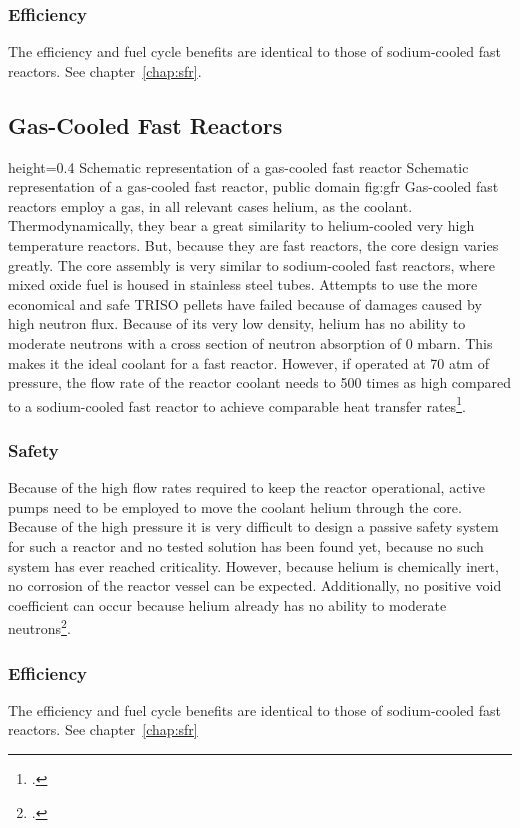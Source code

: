 \subsubsection{Efficiency}
The efficiency and fuel cycle benefits are identical to those of sodium-cooled fast reactors. See chapter~\ref{chap:sfr}.
\pagebreak
\subsection{Gas-Cooled Fast Reactors}
    {height=0.4\textheight}
    {Schematic representation of a gas-cooled fast reactor}
    {Schematic representation of a gas-cooled fast reactor, public domain}
    {fig:gfr}
Gas-cooled fast reactors employ a gas, in all relevant cases helium, as the coolant. Thermodynamically,
they bear a great similarity to helium-cooled very high temperature reactors. But, because they
are fast reactors, the core design varies greatly. The core assembly is very similar to sodium-cooled
fast reactors, where mixed oxide fuel is housed in stainless steel tubes. Attempts to use the more
economical and safe TRISO pellets have failed because of damages caused by high neutron flux. Because
of its very low density, helium has no ability to moderate neutrons with a cross section of neutron
absorption of 0 mbarn. This makes it the ideal coolant for a fast reactor. However, if operated at
70 atm of pressure, the flow rate of the reactor coolant needs to 500 times as high compared to a
sodium-cooled fast reactor to achieve comparable heat transfer rates\footcite[135-144]{T4Gen}.
\subsubsection{Safety}
Because of the high flow rates required to keep the reactor operational, active pumps need to be employed
to move the coolant helium through the core. Because of the high pressure it is very difficult to design
a passive safety system for such a reactor and no tested solution has been found yet, because no such
system has ever reached criticality. However, because helium is chemically inert, no corrosion of the
reactor vessel can be expected. Additionally, no positive void coefficient can occur because helium
already has no ability to moderate neutrons\footcite[135-144]{T4Gen}.
\subsubsection{Efficiency}
The efficiency and fuel cycle benefits are identical to those of sodium-cooled fast reactors. See chapter~\ref{chap:sfr}
\pagebreak
